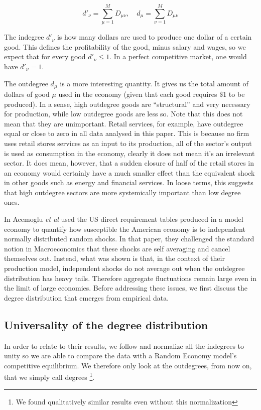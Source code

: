 \begin{equation}
  \label{eq:io_1}
 d'_\nu = \sum_{\mu=1}^M D_{\mu\nu},  \quad  d_\mu = \sum_{\nu = 1}^M D_{\mu\nu}
\end{equation}

The indegree $d'_\nu$ is how many dollars are used to produce one
dollar of a certain good. This defines the profitability of the good,
minus salary and wages, so we expect that for every good $d'_\nu \leq
1$. In a perfect competitive market, one would have $d'_\nu = 1$.

The outdegree $d_\mu$ is a more interesting quantity. It gives us the
total amount of dollars of good $\mu$ used in the economy (given that
each good requires \$1 to be produced). In a sense, high outdegree
goods are ``structural'' and very necessary for production, while low
outdegree goods are less so. Note that this does not mean that they
are unimportant. Retail services, for example, have outdegree equal or
close to zero in all data analysed in this paper. This is because no firm
uses retail stores services as an input to its production, all of
the sector's output is used as consumption in the
economy, clearly it does not mean it's an irrelevant sector. It does
mean, however, that a sudden closure of half of the retail stores in
an economy would certainly have a much smaller effect than the
equivalent shock in other goods such as energy and financial
services. In loose terms, this suggests that high outdegree sectors
are more systemically important than low degree ones.

In \cite{Acemoglu12} Acemoglu \emph{et al} used the US direct requirement
tables produced in a model economy to quantify how susceptible the American
economy is to independent normally distributed random shocks. In that paper, they challenged the standard notion in Macroeconomics that these shocks are self averaging and cancel themselves out. Instead, what was shown is that, in the context of their production model,
independent shocks do not average out when the outdegree distribution
has heavy tails. Therefore aggregate fluctuations remain large even in
the limit of large economies. Before addressing these issues, we
 first discuss the degree distribution that emerges from
empirical data.

\subsection{Universality of the degree distribution}

In order to relate to their results, we follow \cite{Acemoglu12} and
normalize all the indegrees to unity so we are able to compare the
data with a Random Economy model's competitive equilibrium. We
therefore only look at the outdegrees, from now on, that we simply call
degrees \footnote{We found qualitatively similar results even
  without this normalization}.

